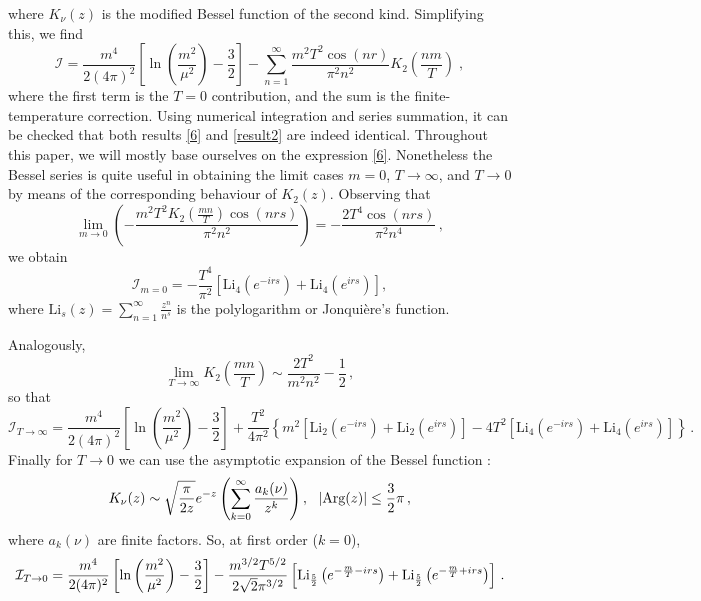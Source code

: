 where $K_{\nu }(z)$ is the modified Bessel function of the second kind.
Simplifying this, we find
\begin{equation}
\mathcal{I}=\frac{m^{4}}{2(4\pi )^{2}}\left[ \ln {\left( \frac{m^{2}}{\mu
^{2}}\right) }-\frac{3}{2}\right] -\sum_{n=1}^{\infty }{\frac{m^{2}T^{2}\cos
{(nr)}}{\pi ^{2}n^{2}}K_{2}\left( \frac{nm}{T}\right) }\;,  \label{result2}
\end{equation}%
where the first term is the $T=0$ contribution, and the sum is the
finite-temperature correction. Using numerical integration and series
summation, it can be checked that both results \eqref{6} and \eqref{result2}
are indeed identical. Throughout this paper, we will mostly base ourselves
on the expression \eqref{6}. Nonetheless the Bessel series is quite useful in
obtaining the limit cases $m=0$, $T\rightarrow \infty $, and $T\rightarrow 0$
by means of the corresponding behaviour of $K_{2}(z)$. Observing that
\begin{equation}
\lim_{m\rightarrow 0}\left( -\frac{m^{2}T^{2}K_{2}\left( \frac{mn}{T}\right)
\cos (nrs)}{\pi ^{2}n^{2}}\right) =-\frac{2T^{4}\cos (nrs)}{\pi ^{2}n^{4}}\,,
\end{equation}%
we obtain
\begin{equation}
\mathcal{I}_{m=0}=-\frac{T^{4}}{\pi ^{2}}\left[ \text{Li}_{4}\left(
e^{-irs}\right) +\text{Li}_{4}\left( e^{irs}\right) \right],
\end{equation}%
where $\text{Li}_{s}(z)=\sum_{n=1}^{\infty}\frac{z^{n}}{n^{s}}$ is the polylogarithm or Jonqui\`ere's function.

Analogously,
\begin{equation*}
\lim_{T\rightarrow\infty}K_2\left( \frac{m n}{T}\right)\sim \frac{2 T^2}{m^2 n^2}-\frac{1}{2}\,,
\end{equation*}
so that
\begin{equation}
\mathcal{I}_{T\rightarrow\infty} = \frac{m^4}{2(4\pi)^2}\left[ \ln{\left(
\frac{m^2}{\mu^2}\right)}-\frac{3}{2} \right]+ \frac{T^2}{4 \pi^2 }
\left\{m^2 \left[\text{Li}_2\left(e^{-i r s}\right)+\text{Li}_2\left(e^{i r
s}\right)\right]-4 T^2 \left[\text{Li}_4\left(e^{-i r s}\right)+\text{Li}%
_4\left(e^{i r s}\right)\right]\right\}\,.
\end{equation}
Finally for $T \rightarrow 0$ we can use the asymptotic expansion of the
Bessel function \cite{as}:
\begin{equation}
K_\nu(z)\sim\sqrt{\frac{\pi}{2z}}e^{-z}\left( \sum_{k=0}^{\infty}\frac{%
a_k(\nu)}{z^k}\right),\ \ |\text{Arg}( z)|\leq\frac{3}{2}\pi\,,
\end{equation}
where $a_{k}(\nu)$ are finite factors. So, at first order ($k=0$),
\begin{eqnarray}
\mathcal{I}_{T\rightarrow0} = \frac{m^4}{2(4\pi)^2}\left[ \ln{\left( \frac{%
m^2}{\mu^2}\right)}-\frac{3}{2} \right]-\frac{m^{3/2} T^{5/2} }{2 \sqrt{2}
\pi ^{3/2}} \left[\text{Li}_{\frac{5}{2}}\left(e^{-\frac{m}{T}-i r s}\right)+%
\text{Li}_{\frac{5}{2}}\left(e^{-\frac{m}{T}+i r s}\right)\right]\,.
\end{eqnarray}

